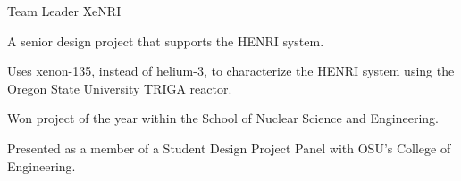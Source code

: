
\begin{cventries}
  \cventry
    {Team Leader} %
    {XeNRI} %
    {} %
    {} %
    {
      \begin{cvitems} %
        \item{A senior design project that supports the HENRI system.}
		\item {Uses xenon-135, instead of helium-3, to characterize the HENRI system using the Oregon State University TRIGA reactor.}
		\item {Won project of the year within the School of Nuclear Science and Engineering.}
		\item{Presented as a member of a Student Design Project Panel with OSU's College of Engineering.}
      \end{cvitems}
    }


\end{cventries}